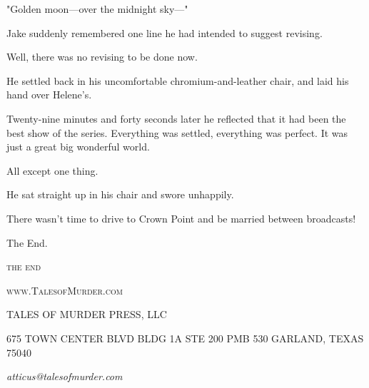 \documentclass{novel}
\begin{document}
"Golden moon—over the midnight sky—"

Jake suddenly remembered one line he had intended to suggest revising.

Well, there was no revising to be done now.

He settled back in his uncomfortable chromium-and-leather chair, and laid his hand over Helene's.

Twenty-nine minutes and forty seconds later he reflected that it had been the best show of the series. Everything was settled, everything was perfect. It was just a great big wonderful world.

All except one thing.

He sat straight up in his chair and swore unhappily.

There wasn't time to drive to Crown Point and be married between broadcasts!

The End.

\vspace{2\nbs}
\clearpage
\thispagestyle{empty}


\scenebreak
\scenebreak
{\centering\textsc{the end}\par}

\clearpage

\null

\centering\textsc{www.TalesofMurder.com}\par

\vspace*{10\nbs}


TALES OF MURDER PRESS, LLC

\null

\scshape{675 TOWN CENTER BLVD
BLDG 1A STE 200 PMB 530
GARLAND, TEXAS 75040}

\null

\textit{atticus@talesofmurder.com}
\vfill
\end{document}
